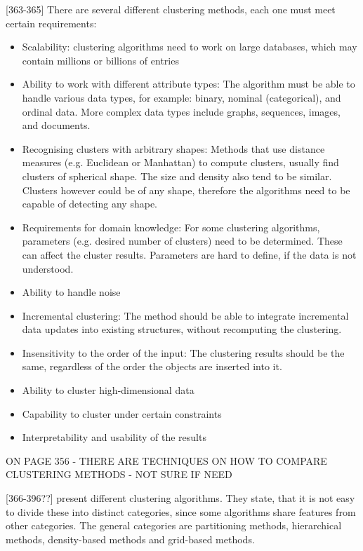 \textcite{han2011data}[363-365]
There are several different clustering methods, each one must meet certain requirements:
\begin{itemize}
  \item Scalability: clustering algorithms need to work on large databases, which may contain millions or billions of entries
  \item Ability to work with different attribute types: The algorithm must be able to handle various data types, for example: binary, nominal (categorical), and ordinal data. More complex data types include graphs, sequences, images, and documents.
  \item Recognising clusters with arbitrary shapes: Methods that use distance measures (e.g. Euclidean or Manhattan) to compute clusters, usually find clusters of spherical shape. The size and density also tend to be similar. Clusters however could be of any shape, therefore the algorithms need to be capable of detecting any shape.
  \item Requirements for domain knowledge: For some clustering algorithms, parameters (e.g. desired number of clusters) need to be determined. These can affect the cluster results. Parameters are hard to define, if the data is not understood.
  \item Ability to handle noise
  \item Incremental clustering: The method should be able to integrate incremental data updates into existing structures, without recomputing the clustering.
  \item Insensitivity to the order of the input: The clustering results should be the same, regardless of the order the objects are inserted into it.
  \item Ability to cluster high-dimensional data %
  \item Capability to cluster under certain constraints %
  \item Interpretability and usability of the results
\end{itemize}

ON PAGE 356 - THERE ARE TECHNIQUES ON HOW TO COMPARE CLUSTERING METHODS - NOT SURE IF NEED

\textcite{han2011data}[366-396??] present different clustering algorithms. They state, that it is not easy to divide these into distinct categories, since some algorithms share features from other categories. The general categories are partitioning methods, hierarchical methods, density-based methods and grid-based methods.

